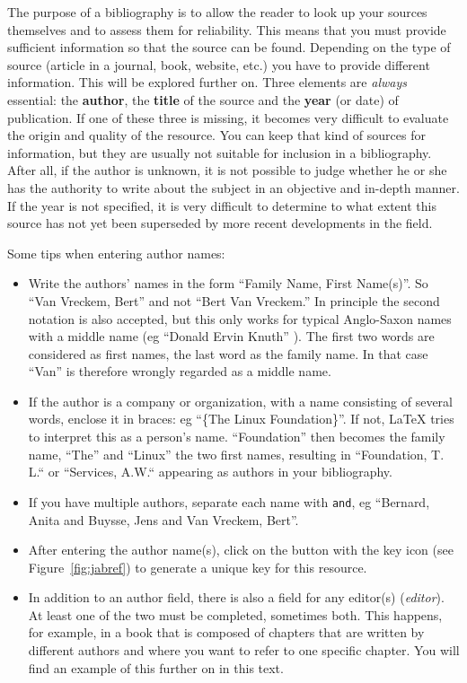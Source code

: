 The purpose of a bibliography is to allow the reader to look up your sources themselves and to assess them for reliability. This means that you must provide sufficient information so that the source can be found. Depending on the type of source (article in a journal, book, website, etc.) you have to provide different information. This will be explored further on. Three elements are \emph{always} essential: the \textbf{author}, the \textbf{title} of the source and the \textbf{year} (or date) of publication. If one of these three is missing, it becomes very difficult to evaluate the origin and quality of the resource. You can keep that kind of sources for information, but they are usually not suitable for inclusion in a bibliography. After all, if the author is unknown, it is not possible to judge whether he or she has the authority to write about the subject in an objective and in-depth manner. If the year is not specified, it is very difficult to determine to what extent this source has not yet been superseded by more recent developments in the field.

Some tips when entering author names:

\begin{itemize}

  \item Write the authors' names in the form ``Family Name, First Name(s)''. So ``Van Vreckem, Bert'' and not ``Bert Van Vreckem.'' In principle the second notation is also accepted, but this only works for typical Anglo-Saxon names with a middle name (eg ``Donald Ervin Knuth'' ). The first two words are considered as first names, the last word as the family name. In that case ``Van'' is therefore wrongly regarded as a middle name.
  \item If the author is a company or organization, with a name consisting of several words, enclose it in braces: eg ``\{The Linux Foundation\}''. If not, {\LaTeX} tries to interpret this as a person's name. ``Foundation'' then becomes the family name, ``The'' and ``Linux'' the two first names, resulting in ``Foundation, T. L.``  or ``Services, A.W.`` appearing as authors in your bibliography.
  \item If you have multiple authors, separate each name with \texttt{and}, eg ``Bernard, Anita and Buysse, Jens and Van Vreckem, Bert''.
  \item After entering the author name(s), click on the button with the key icon (see Figure~\ref{fig:jabref}) to generate a unique key for this resource.
  \item In addition to an author field, there is also a field for any editor(s) (\emph{editor}). At least one of the two must be completed, sometimes both. This happens, for example, in a book that is composed of chapters that are written by different authors and where you want to refer to one specific chapter. You will find an example of this further on in this text.
\end{itemize}

